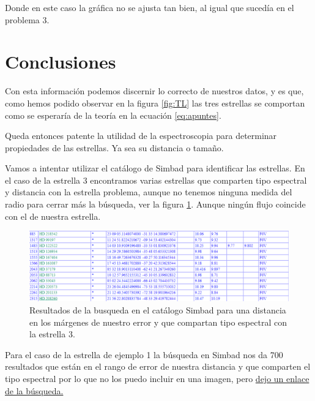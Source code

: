 \documentclass{aa} %
\begin{document}
Donde en este caso la gráfica no se ajusta tan bien, al igual que sucedía en el problema 3.

\section{Conclusiones}

Con esta información podemos discernir lo correcto de nuestros datos, y es que, como hemos podido observar en la figura \ref{fig:TL} las tres estrellas se comportan como se esperaría de la teoría en la ecuación \ref{eq:apuntes}.

Queda entonces patente la utilidad de la espectroscopia para determinar propiedades de las estrellas. Ya sea su distancia o tamaño.

Vamos a intentar utilizar el catálogo de Simbad \cite{CiteDrive2022} para identificar las estrellas. En el caso de la estrella 3 encontramos varias estrellas que comparten tipo espectral y distancia con la estrella problema, aunque no tenemos ninguna medida del radio para cerrar más la búsqueda, ver la figura \ref{fig:simbad3}. Aunque ningún flujo coincide con el de nuestra estrella.

\begin{figure}[h!]
\begin{center}
\includegraphics[scale=0.3]{simbad3.png}
\caption{Resultados de la busqueda en el catálogo Simbad para una distancia en los márgenes de nuestro error y que compartan tipo espectral con la estrella 3.}
\label{fig:simbad3}
\end{center}
\end{figure}

Para el caso de la estrella de ejemplo 1 la búsqueda en Simbad nos da 700 resultados que están en el rango de error de nuestra distancia y que comparten el tipo espectral por lo que no los puedo incluir en una imagen, pero \href{https://simbad.cds.unistra.fr/simbad/sim-sam?Criteria=Distance.distance+<%3D+720+%26+Distance.distance+>%3D+600+%26+sptype+%3D+%27A0V%27&submit=submit+query&OutputMode=LIST&maxObject=10000&CriteriaFile=}{dejo un enlace de la búsqueda.}
\end{document}
